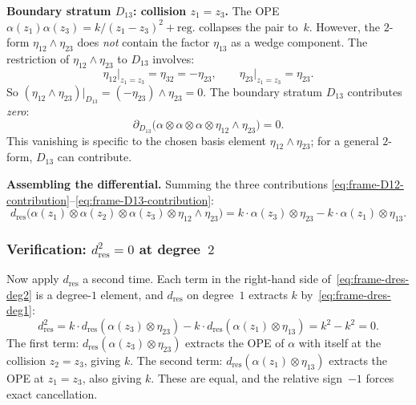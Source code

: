 \medskip
\noindent\textbf{Boundary stratum $D_{13}$: collision $z_1 = z_3$.}
The OPE $\alpha(z_1)\alpha(z_3) = k/(z_1 - z_3)^2 + \mathrm{reg.}$
collapses the pair to~$k$. However, the $2$-form
$\eta_{12} \wedge \eta_{23}$ does \emph{not} contain the
factor $\eta_{13}$ as a wedge component. The restriction of
$\eta_{12} \wedge \eta_{23}$ to $D_{13}$ involves:
\[
\eta_{12}\big|_{z_1 = z_3} = \eta_{32}
= -\eta_{23}, \qquad
\eta_{23}\big|_{z_1 = z_3} = \eta_{23}.
\]
So $(\eta_{12} \wedge \eta_{23})|_{D_{13}}
= (-\eta_{23}) \wedge \eta_{23} = 0$.
The boundary stratum $D_{13}$ contributes \emph{zero}:
\begin{equation}\label{eq:frame-D13-contribution}
\partial_{D_{13}}\bigl(
 \alpha \otimes \alpha \otimes \alpha \otimes
 \eta_{12} \wedge \eta_{23}
\bigr)
= 0.
\end{equation}
This vanishing is specific to the chosen basis element
$\eta_{12} \wedge \eta_{23}$; for a general $2$-form,
$D_{13}$ can contribute.

\medskip
\noindent\textbf{Assembling the differential.}
Summing the three contributions
\eqref{eq:frame-D12-contribution}--\eqref{eq:frame-D13-contribution}:
\begin{equation}\label{eq:frame-dres-deg2}
d_{\mathrm{res}}\bigl(\alpha(z_1) \otimes \alpha(z_2)
\otimes \alpha(z_3) \otimes \eta_{12} \wedge \eta_{23}\bigr)
= k \cdot \alpha(z_3) \otimes \eta_{23}
 - k \cdot \alpha(z_1) \otimes \eta_{13}.
\end{equation}

\subsubsection*{Verification: $d_{\mathrm{res}}^2 = 0$ at degree~$2$}

Now apply $d_{\mathrm{res}}$ a second time. Each term in the
right-hand side of~\eqref{eq:frame-dres-deg2} is a degree-$1$
element, and $d_{\mathrm{res}}$ on degree~$1$ extracts $k$
by~\eqref{eq:frame-dres-deg1}:
\begin{equation}\label{eq:frame-dsquared-deg2}
d_{\mathrm{res}}^2 = k \cdot d_{\mathrm{res}}(\alpha(z_3)
\otimes \eta_{23}) - k \cdot d_{\mathrm{res}}(\alpha(z_1)
\otimes \eta_{13}) = k^2 - k^2 = 0.
\end{equation}
The first term: $d_{\mathrm{res}}(\alpha(z_3) \otimes \eta_{23})$
extracts the OPE of $\alpha$ with itself at the collision
$z_2 = z_3$, giving $k$. The second term:
$d_{\mathrm{res}}(\alpha(z_1) \otimes \eta_{13})$ extracts the
OPE at $z_1 = z_3$, also giving $k$. These are equal, and
the relative sign~$-1$ forces exact cancellation.

